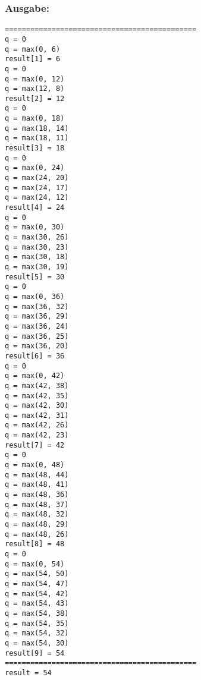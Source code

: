 \documentclass[a4paper]{article}
\begin{document}
\subsubsection*{Ausgabe:}
\begin{verbatim}
=============================================
q = 0
q = max(0, 6)
result[1] = 6
q = 0
q = max(0, 12)
q = max(12, 8)
result[2] = 12
q = 0
q = max(0, 18)
q = max(18, 14)
q = max(18, 11)
result[3] = 18
q = 0
q = max(0, 24)
q = max(24, 20)
q = max(24, 17)
q = max(24, 12)
result[4] = 24
q = 0
q = max(0, 30)
q = max(30, 26)
q = max(30, 23)
q = max(30, 18)
q = max(30, 19)
result[5] = 30
q = 0
q = max(0, 36)
q = max(36, 32)
q = max(36, 29)
q = max(36, 24)
q = max(36, 25)
q = max(36, 20)
result[6] = 36
q = 0
q = max(0, 42)
q = max(42, 38)
q = max(42, 35)
q = max(42, 30)
q = max(42, 31)
q = max(42, 26)
q = max(42, 23)
result[7] = 42
q = 0
q = max(0, 48)
q = max(48, 44)
q = max(48, 41)
q = max(48, 36)
q = max(48, 37)
q = max(48, 32)
q = max(48, 29)
q = max(48, 26)
result[8] = 48
q = 0
q = max(0, 54)
q = max(54, 50)
q = max(54, 47)
q = max(54, 42)
q = max(54, 43)
q = max(54, 38)
q = max(54, 35)
q = max(54, 32)
q = max(54, 30)
result[9] = 54
=============================================
result = 54
\end{verbatim}
\end{document}
